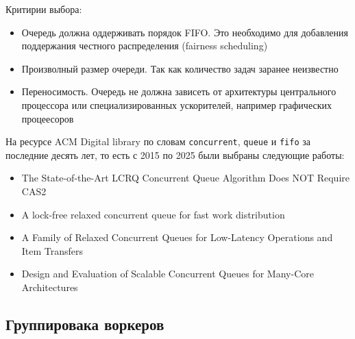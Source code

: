Критирии выбора:

\begin{itemize}
    \item Очередь должна оддерживать порядок FIFO. Это необходимо для добавления поддержания честного распределения (fairness scheduling)
    \item Произволный размер очереди. Так как количество задач заранее неизвестно
    \item Переносимость. Очередь не должна зависеть от архитектуры центрального процессора или специализированных ускорителей, например графических процеесоров
\end{itemize}

На ресурсе ACM Digital library по словам \verb|concurrent|, \verb|queue| и \verb|fifo| за последние десять лет, то есть с 2015 по 2025 были выбраны следующие работы:

\begin{itemize}
    \item The State-of-the-Art LCRQ Concurrent Queue Algorithm Does NOT Require CAS2~\cite{LCRQNoCAS2}
    \item A lock-free relaxed concurrent queue for fast work distribution~\cite{FastWorkDistribution} %
    \item A Family of Relaxed Concurrent Queues for Low-Latency Operations and Item Transfers~\cite{FamilyRelaxedConcurrentQueues} %
    \item Design and Evaluation of Scalable Concurrent Queues for Many-Core Architectures~\cite{ScalableConcurrentQueuesManyCoreArchitectures}  %
\end{itemize}

\subsection{Группировака воркеров}

